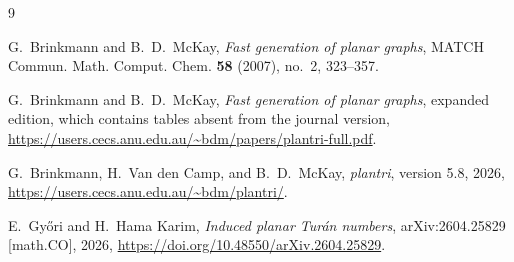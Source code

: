 \documentclass[11pt]{amsart}
\begin{document}
\begin{thebibliography}{9}

G.~Brinkmann and B.~D.~McKay,
\emph{Fast generation of planar graphs},
MATCH Commun. Math. Comput. Chem. \textbf{58} (2007), no.~2, 323--357.

G.~Brinkmann and B.~D.~McKay,
\emph{Fast generation of planar graphs}, expanded edition, which contains
tables absent from the journal version,
\url{https://users.cecs.anu.edu.au/~bdm/papers/plantri-full.pdf}.

G.~Brinkmann, H.~Van den Camp, and B.~D.~McKay,
\emph{plantri}, version 5.8, 2026,
\url{https://users.cecs.anu.edu.au/~bdm/plantri/}.

E.~Gy\H{o}ri and H.~Hama Karim,
\emph{Induced planar Tur\'an numbers},
arXiv:2604.25829 [math.CO], 2026,
\url{https://doi.org/10.48550/arXiv.2604.25829}.

\end{thebibliography}
\end{document}
